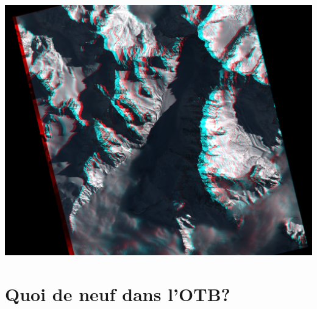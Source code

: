 \documentclass[8pt]{beamer}
\begin{document}
\vspace*{-6.5mm}    
\begin{frame}[plain]
\hspace*{-11mm}
    \includegraphics[keepaspectratio,width=1.005\paperwidth,height=1.1\paperheight]{images/argentiere_anaglyphe.png}
\end{frame} 

\section{Quoi de neuf dans l'OTB?}
\end{document}

